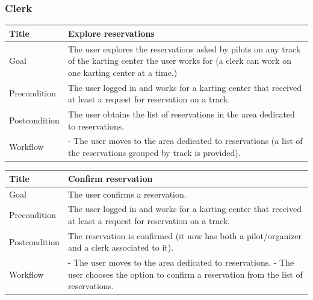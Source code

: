 \documentclass{beamer}
\begin{document}
\begin{frame}
    \frametitle{Clerk}
    \begin{table}
        \tiny
        \begin{tabular}{|p{2cm}|p{6cm}|}
        \hline  
        Title & \textbf{Explore reservations} \\
        \hline
        Goal & The user explores the reservations asked by pilots on any track of the karting
        center the user works for (a clerk can work on one karting center at a time.) \\
        \hline
        Precondition & The user logged in and works for a karting center
        that received at least a request for reservation on a track. \\
        \hline
        Postcondition & The user obtains the list of reservations in the area dedicated to reservations. \\
        \hline
        Workflow &
        - The user moves to the area dedicated to reservations (a list of the reservations grouped by 
        track is provided). \\
        \hline
        \end{tabular}
\end{table}

\begin{table}
    \tiny
    \begin{tabular}{|p{2cm}|p{6cm}|}
    \hline  
    Title & \textbf{Confirm reservation} \\
    \hline
    Goal & The user confirms a reservation. \\
    \hline
    Precondition & The user logged in and works for a karting center that received
    at least a request for reservation on a track. \\
    \hline
    Postcondition & The reservation is confirmed (it now has both a pilot/organizer and a clerk associated
    to it). \\
    \hline
    Workflow &
    - The user moves to the area dedicated to reservations. \newline
    - The user chooses the option to confirm a reservation from the list of reservations. \\
    \hline
    \end{tabular}
\end{table}

\end{frame}
\end{document}
